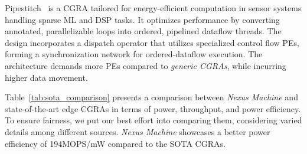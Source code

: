 \iffalse
Pipestitch~\cite{pipestitch} is a CGRA that enables efficient and flexible computation for sparse ML and DSP workloads in energy-minimal sensor systems. Pipestitch transforms each iteration of annotated, parallelizable loops into in-order, pipelined dataflow threads. 
The architecture introduces a dispatch operator mapped to specialized control flow PEs forming a synchronization network to ensure ordered-dataflow execution.
These extra dedicated control flow PEs lead to higher PE requirements vs. \textit{generic CGRAs} while still incurring high data movement.
\fi
Pipestitch~\cite{pipestitch} is a CGRA tailored for energy-efficient computation in sensor systems handling sparse ML and DSP tasks. 
It optimizes performance by converting annotated, parallelizable loops into ordered, pipelined dataflow threads.
The design incorporates a dispatch operator that utilizes specialized control flow PEs, forming a synchronization network for ordered-dataflow execution. 
The architecture demands more PEs compared to \textit{generic CGRAs}, while incurring higher data movement.

Table~\ref{tab:sota_comparison} presents a comparison between \textit{Nexus Machine} and state-of-the-art edge CGRAs in terms of power, throughput, and power efficiency.
To ensure fairness, we put our best effort into comparing them, considering varied details among different sources.
\textit{Nexus Machine} showcases a better power efficiency of 194MOPS/mW compared to the SOTA CGRAs.

